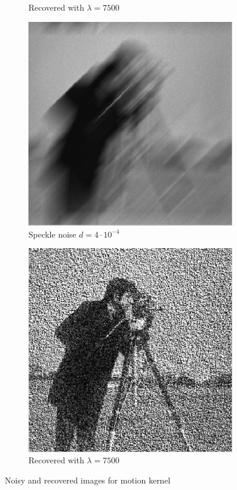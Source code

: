 \documentclass[a4paper, 10pt, conference] {article}
\begin{document}
\begin{figure}[H]
\begin{subfigure}{0.49\textwidth}
		\caption{Recovered with $\lambda = 7500$}
	\end{subfigure}
	\begin{subfigure}{0.49\textwidth} 
		\centering						
		\includegraphics[scale=0.48]{motion/noisy/speckle_d00004.PNG}
		\caption{Speckle noise $d =4\cdot 10^{-4}$}
	\end{subfigure}
	\begin{subfigure}{0.49\textwidth} 
		\centering						
		\includegraphics[scale=0.48]{motion/noisy/recovered_speckle_d00004.PNG}
		\caption{Recovered with $\lambda = 7500$}
	\end{subfigure}
	\caption{Noisy and recovered images for motion kernel}
	\label{noisy2}
\end{figure}
\end{document}

